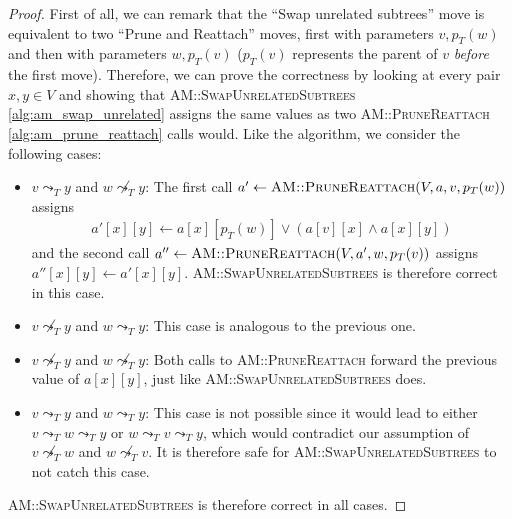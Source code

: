 \begin{proof}
    First of all, we can remark that the ``Swap unrelated subtrees'' move is equivalent to two ``Prune and Reattach'' moves, first with parameters $v, p_T(w)$ and then with parameters $w, p_T(v)$ ($p_T(v)$ represents the parent of $v$ \textit{before} the first move). Therefore, we can prove the correctness by looking at every pair $x,y \in V$ and showing that \textsc{AM::SwapUnrelatedSubtrees} \ref{alg:am_swap_unrelated} assigns the same values as two \textsc{AM::PruneReattach} \ref{alg:am_prune_reattach} calls would. Like the algorithm, we consider the following cases:
    \begin{itemize}
        \item $v \leadsto_T y$ and $w \not\leadsto_T y$: The first call $a' \leftarrow \textsc{AM::PruneReattach}(V, a, v, p_T(w))$ assigns 
        \begin{align*}
            a'[x][y] \leftarrow a[x][p_T(w)] \vee (a[v][x] \wedge a[x][y])
        \end{align*}
        and the second call $a'' \leftarrow \textsc{AM::PruneReattach}(V, a', w, p_T(v))$ assigns $a''[x][y] \leftarrow a'[x][y]$. \textsc{AM::SwapUnrelatedSubtrees} is therefore correct in this case.
        \item $v \not\leadsto_T y$ and $w \leadsto_T y$: This case is analogous to the previous one.
        \item $v \not\leadsto_T y$ and $w \not\leadsto_T y$: Both calls to \textsc{AM::PruneReattach} forward the previous value of $a[x][y]$, just like \textsc{AM::SwapUnrelatedSubtrees} does.
        \item $v \leadsto_T y$ and $w \leadsto_T y$: This case is not possible since it would lead to either $v \leadsto_T w \leadsto_T y$ or $w \leadsto_T v \leadsto_T y$, which would contradict our assumption of $v \not\leadsto_T w$ and $w \not\leadsto_T v$. It is therefore safe for \textsc{AM::SwapUnrelatedSubtrees} to not catch this case.
    \end{itemize}
    \textsc{AM::SwapUnrelatedSubtrees} is therefore correct in all cases.
\end{proof}


